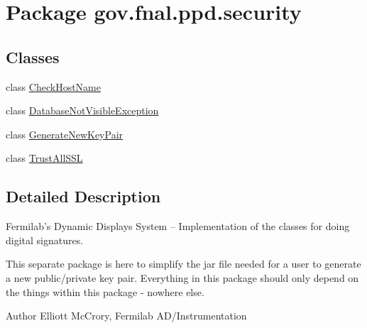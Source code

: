 \hypertarget{namespacegov_1_1fnal_1_1ppd_1_1security}{\section{Package gov.\-fnal.\-ppd.\-security}
\label{namespacegov_1_1fnal_1_1ppd_1_1security}
}
\subsection*{Classes}
\begin{DoxyCompactItemize}
\item 
class \hyperlink{classgov_1_1fnal_1_1ppd_1_1security_1_1CheckHostName}{Check\-Host\-Name}
\item 
class \hyperlink{classgov_1_1fnal_1_1ppd_1_1security_1_1DatabaseNotVisibleException}{Database\-Not\-Visible\-Exception}
\item 
class \hyperlink{classgov_1_1fnal_1_1ppd_1_1security_1_1GenerateNewKeyPair}{Generate\-New\-Key\-Pair}
\item 
class \hyperlink{classgov_1_1fnal_1_1ppd_1_1security_1_1TrustAllSSL}{Trust\-All\-S\-S\-L}
\end{DoxyCompactItemize}


\subsection{Detailed Description}
Fermilab's Dynamic Displays System -- Implementation of the classes for doing digital signatures. 

This separate package is here to simplify the jar file needed for a user to generate a new public/private key pair. Everything in this package should only depend on the things within this package -\/ nowhere else. 

\begin{DoxyAuthor}{Author}
Elliott Mc\-Crory, Fermilab A\-D/\-Instrumentation 
\end{DoxyAuthor}
